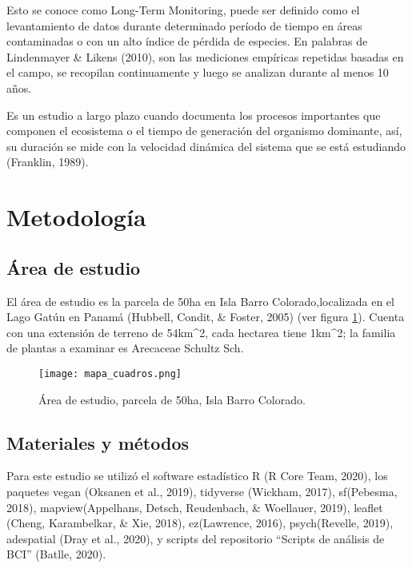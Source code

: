 \documentclass[11pt,]{article}
\begin{document}
Esto se conoce como Long-Term Monitoring, puede ser definido como el
levantamiento de datos durante determinado período de tiempo en áreas
contaminadas o con un alto índice de pérdida de especies. En palabras de
Lindenmayer \& Likens (2010), son las mediciones empíricas repetidas
basadas en el campo, se recopilan continuamente y luego se analizan
durante al menos 10 años.

Es un estudio a largo plazo cuando documenta los procesos importantes
que componen el ecosistema o el tiempo de generación del organismo
dominante, así, su duración se mide con la velocidad dinámica del
sistema que se está estudiando (Franklin, 1989).

\section{Metodología}\label{metodologuxeda}

\subsection{Área de estudio}\label{uxe1rea-de-estudio}

El área de estudio es la parcela de 50ha en Isla Barro
Colorado,localizada en el Lago Gatún en Panamá (Hubbell, Condit, \&
Foster, 2005) (ver figura \ref{fig:mapa_cuadros}). Cuenta con una
extensión de terreno de 54km\^{}2, cada hectarea tiene 1km\^{}2; la
familia de plantas a examinar es Arecaceae Schultz Sch.

\begin{figure}
\centering
\texttt{[image: mapa\_cuadros.png]}
\caption{Área de estudio, parcela de 50ha, Isla Barro Colorado.
\label{fig:mapa_cuadros}}
\end{figure}

\subsection{Materiales y métodos}\label{materiales-y-muxe9todos}

Para este estudio se utilizó el software estadístico R (R Core Team,
2020), los paquetes vegan (Oksanen et al., 2019), tidyverse (Wickham,
2017), sf(Pebesma, 2018), mapview(Appelhans, Detsch, Reudenbach, \&
Woellauer, 2019), leaflet (Cheng, Karambelkar, \& Xie, 2018),
ez(Lawrence, 2016), psych(Revelle, 2019), adespatial (Dray et al.,
2020), y scripts del repositorio ``Scripts de análisis de BCI'' (Batlle,
2020).
\end{document}

